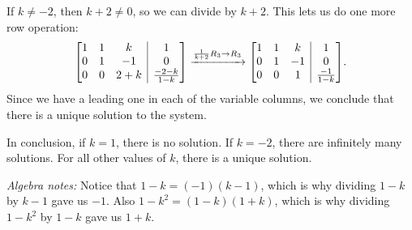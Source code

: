 \documentclass[12pt]{article}
\makeatletter
\newenvironment{amatrix}[1]{%
  \left[\begin{array}{@{}*{#1}{c}|c@{}}
}{%
  \end{array}\right]
}
\newcommand{\bam}{\begin{amatrix}}
\newcommand{\eam}{\end{amatrix}}
\makeatother
\begin{document}
\begin{enumerate}
If $k\neq -2$, then $k+2\neq 0$, so we can divide by $k+2$. This lets us do one more row operation:
\[
\bam{3}
1&1&k&1\\
0&1&-1&0\\
0&0&2+k&\frac{-2-k}{1-k}\eam\xrightarrow{\frac{1}{k+2}R_3\to R_3}
\bam{3}
1&1&k&1\\
0&1&-1&0\\
0&0&1&\frac{-1}{1-k}\eam.
\]
Since we have a leading one in each of the variable columns, we conclude that there is a unique solution to the system.

In conclusion, if $k=1$, there is no solution. If $k=-2$, there are infinitely many solutions. For all other values of $k$, there is a unique solution.

\textit{Algebra notes:} Notice that $1-k=(-1)(k-1)$, which is why dividing $1-k$ by $k-1$ gave us $-1$. Also $1-k^2=(1-k)(1+k)$, which is why dividing $1-k^2$ by $1-k$ gave us $1+k$. 
 \end{enumerate}
 
\end{document}
